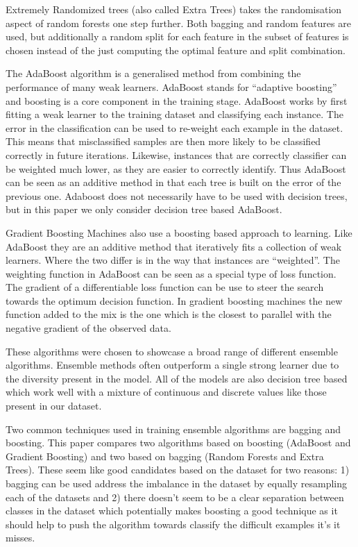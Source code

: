 \documentclass[journal]{IEEEtran}
\begin{document}
Extremely Randomized trees \cite{geurts2006extremely} (also called Extra Trees) takes the randomisation aspect of random forests one step further. Both bagging and random features are used, but additionally a random split for each feature in the subset of features is chosen instead of the just computing the optimal feature and split combination.

The AdaBoost algorithm \cite{freund1997decision} is a generalised method from combining the performance of many weak learners. AdaBoost stands for ``adaptive boosting'' and boosting is a core component in the training stage. AdaBoost works by first fitting a weak learner to the training dataset and classifying each instance. The error in the classification can be used to re-weight each example in the dataset. This means that misclassified samples are then more likely to be classified correctly in future iterations. Likewise, instances that are correctly classifier can be weighted much lower, as they are easier to correctly identify. Thus AdaBoost can be seen as an additive method in that each tree is built on the error of the previous one. Adaboost does not necessarily have to be used with decision trees, but in this paper we only consider decision tree based AdaBoost.

Gradient Boosting Machines \cite{natekin2013gradient} also use a boosting based approach to learning. Like AdaBoost they are an additive method that iteratively fits a collection of weak learners. Where the two differ is in the way that instances are ``weighted''. The weighting function in AdaBoost can be seen as a special type of loss function. The gradient of a differentiable loss function can be use to steer the search towards the optimum decision function. In gradient boosting machines the new function added to the mix is the one which is the closest to parallel with the negative gradient of the observed data.

These algorithms were chosen to showcase a broad range of different ensemble algorithms. Ensemble methods often outperform a single strong learner due to the diversity present in the model. All of the models are also decision tree based which work well with a mixture of continuous and discrete values like those present in our dataset. 

Two common techniques used in training ensemble algorithms are bagging and boosting. This paper compares two algorithms based on boosting (AdaBoost and Gradient Boosting) and two based on bagging (Random Forests and Extra Trees). These seem like good candidates based on the dataset for two reasons: 1) bagging can be used address the imbalance in the dataset by equally resampling each of the datasets and 2) there doesn't seem to be a clear separation between classes in the dataset which potentially makes boosting a good technique as it should help to push the algorithm towards classify the difficult examples it's it misses.
\end{document}
